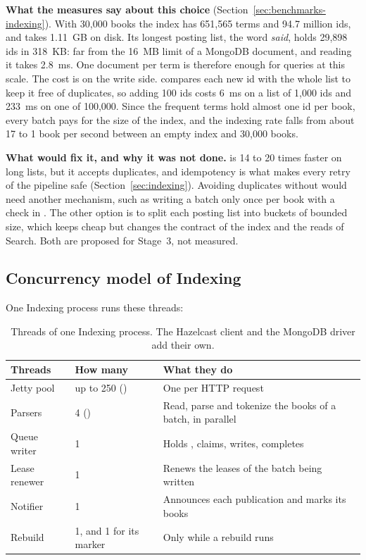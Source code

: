 \textbf{What the measures say about this choice} (Section~\ref{sec:benchmarks-indexing}). With 30,000 books the index has
651,565 terms and 94.7 million ids, and takes 1.11~GB on disk. Its longest posting list, the word \emph{said}, holds
29,898 ids in 318~KB: far from the 16~MB limit of a MongoDB document, and reading it takes 2.8~ms. One document per
term is therefore enough for queries at this scale. The cost is on the write side.  compares each new
id with the whole list to keep it free of duplicates, so adding 100 ids costs 6~ms on a list of 1,000 ids and 233~ms on
one of 100,000. Since the frequent terms hold almost one id per book, every batch pays for the size of the index, and
the indexing rate falls from about 17 to 1 book per second between an empty index and 30,000 books.

\textbf{What would fix it, and why it was not done.}  is 14 to 20 times faster on long lists, but it accepts
duplicates, and idempotency is what makes every retry of the pipeline safe (Section~\ref{sec:indexing}). Avoiding
duplicates without  would need another mechanism, such as writing a batch only once per book with a
check in . The other option is to split each posting list into buckets of bounded size, which keeps
 cheap but changes the contract of the index and the reads of Search. Both are proposed for Stage~3, not
measured.

\subsection{Concurrency model of Indexing}

One Indexing process runs these threads:

\begin{table}[H]
\centering\small
\begin{tabularx}{\linewidth}{@{}L{2.6cm}L{4.4cm}X@{}}
\toprule
\textbf{Threads} & \textbf{How many} & \textbf{What they do} \\
\midrule
Jetty pool & up to 250 () & One per HTTP request \\
Parsers & 4 () & Read, parse and tokenize the books of a batch, in parallel \\
Queue writer & 1 & Holds , claims, writes, completes \\
Lease renewer & 1 & Renews the leases of the batch being written \\
Notifier & 1 & Announces each publication and marks its books  \\
Rebuild & 1, and 1 for its marker & Only while a rebuild runs \\
\bottomrule
\end{tabularx}
\caption{Threads of one Indexing process. The Hazelcast client and the MongoDB driver add their own.}
\end{table}

